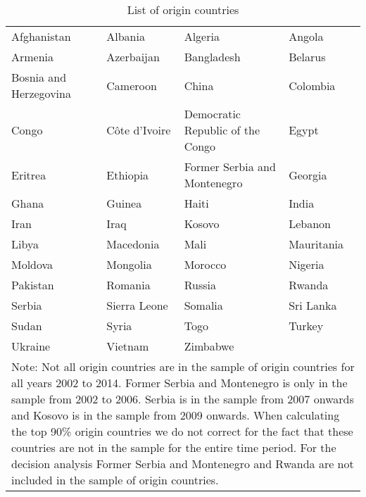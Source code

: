 \begin{table}[!ht]\centering \footnotesize
	\caption{List of origin countries}
	\begin{tabular}{l l l l}
		\hline \hline
		Afghanistan & Albania & 	Algeria & 	Angola \\
		\smallskip
		Armenia & 	Azerbaijan & 	Bangladesh & Belarus \\
		\smallskip
		Bosnia and Herzegovina & 	Cameroon & 	China & Colombia \\
		\smallskip
		Congo & 	Côte d'Ivoire & Democratic Republic of the Congo & 	Egypt \\
		\smallskip
		Eritrea & 	Ethiopia & 	Former Serbia and Montenegro & 	Georgia  \\
		\smallskip
		Ghana & Guinea & 	Haiti & India \\
		\smallskip
		Iran &  Iraq &  Kosovo & Lebanon \\
		\smallskip
		Libya & Macedonia & Mali & 	Mauritania \\
		\smallskip
		Moldova & 	Mongolia & 	Morocco & 	Nigeria \\
		\smallskip
		Pakistan & 	Romania & 	Russia & 	Rwanda \\
		\smallskip
		Serbia & Sierra Leone & Somalia & Sri Lanka \\
		\smallskip
		Sudan & Syria & Togo & Turkey \\
		\smallskip
		Ukraine & 	Vietnam & 	Zimbabwe & \\
		\hline \hline
		\multicolumn{4}{p{14.3cm}}{Note: Not all origin countries are in the sample of origin countries for all years 2002 to 2014. Former Serbia and Montenegro is only in the sample from 2002 to 2006. Serbia is in the sample from 2007 onwards and Kosovo is in the sample from 2009 onwards. When calculating the top 90\% origin countries we do not correct for the fact that these countries are not in the sample for the entire time period. For the decision analysis Former Serbia and Montenegro and Rwanda are not included in the sample of origin countries.}
	\end{tabular}
\label{all_origin}
\end{table}
